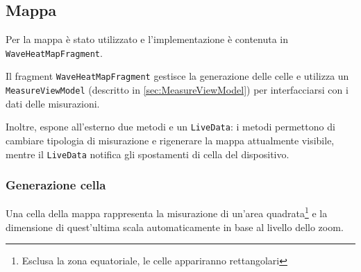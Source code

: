
\subsection{Mappa}
Per la mappa è stato utilizzato \gmaps{} e l'implementazione è contenuta in \texttt{WaveHeatMapFragment}.

Il fragment \texttt{WaveHeatMapFragment} gestisce la generazione delle celle e utilizza un \texttt{MeasureViewModel} (descritto in \cref{sec:MeasureViewModel}) per interfacciarsi con i dati delle misurazioni.

Inoltre, espone all'esterno due metodi e un \texttt{LiveData}: i metodi permettono di cambiare tipologia di misurazione e rigenerare la mappa attualmente visibile, mentre il \texttt{LiveData} notifica gli spostamenti di cella del dispositivo.


\subsubsection{Generazione cella}
Una cella della mappa rappresenta la misurazione di un'area quadrata\footnote{Esclusa la zona equatoriale, le celle appariranno rettangolari} e la dimensione di quest'ultima scala automaticamente in base al livello dello zoom.

